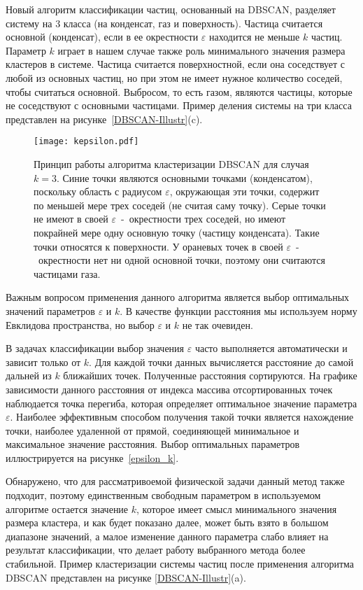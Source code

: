 Новый алгоритм классификации частиц, основанный на DBSCAN, разделяет систему на 3 класса (на конденсат, газ и поверхность).
Частица считается основной (конденсат), если в ее окрестности $\varepsilon$ находится не меньше $k$ частиц.
Параметр $k$ играет в нашем случае также роль минимального значения размера кластеров в системе.
Частица считается поверхностной, если она соседствует с любой из основных частиц, но при этом не имеет нужное количество соседей, чтобы считаться основной.
Выбросом, то есть газом, являются частицы, которые не соседствуют с основными частицами.
Пример деления системы на три класса представлен на рисунке~\ref{DBSCAN-Illustr}(c).

\begin{figure}[!t]
    \centering
    \texttt{[image: kepsilon.pdf]}
    \caption{Принцип работы алгоритма кластеризации DBSCAN для случая $k = 3$.
    Синие точки являются основными точками (конденсатом), поскольку область с радиусом $\varepsilon$, окружающая эти точки, содержит по меньшей мере трех соседей (не считая саму точку).
    Серые точки не имеют в своей $\varepsilon$~-~окрестности трех соседей, но имеют покрайней мере одну основную точку (частицу конденсата).
    Такие точки относятся к поверхности.
    У ораневых точек в своей $\varepsilon$~-~окрестности нет ни одной основной точки, поэтому они считаются частицами газа.}
    \label{kepsilon}
\end{figure}

Важным вопросом применения данного алгоритма является выбор оптимальных значений параметров $\varepsilon$ и $k$.
В качестве функции расстояния мы используем норму Евклидова пространства, но выбор $\varepsilon$ и $k$ не так очевиден.

В задачах классификации выбор значения $\varepsilon$ часто выполняется автоматически и зависит только от $k$.
Для каждой точки данных вычисляется расстояние до самой дальней из $k$ ближайших точек.
Полученные расстояния сортируются.
На графике зависимости данного расстояния от индекса массива отсортированных точек наблюдается точка перегиба, которая определяет оптимальное значение параметра $\varepsilon$.
Наиболее эффективным способом получения такой точки является нахождение точки, наиболее удаленной от прямой, соединяющей минимальное и максимальное значение расстояния.
Выбор оптимальных параметров иллюстрируется на рисунке~\ref{epsilon_k}.

Обнаружено, что для рассматривоемой физической задачи данный метод также подходит, поэтому единственным свободным параметром в используемом алгоритме остается значение $k$, которое имеет смысл минимального значения размера кластера, и как будет показано далее, может быть взято в большом диапазоне значений, а малое изменение данного параметра слабо влияет на результат классификации, что делает работу выбранного метода более стабильной.
Пример кластеризации системы частиц после применения алгоритма DBSCAN представлен на рисунке \ref{DBSCAN-Illustr}(a).

